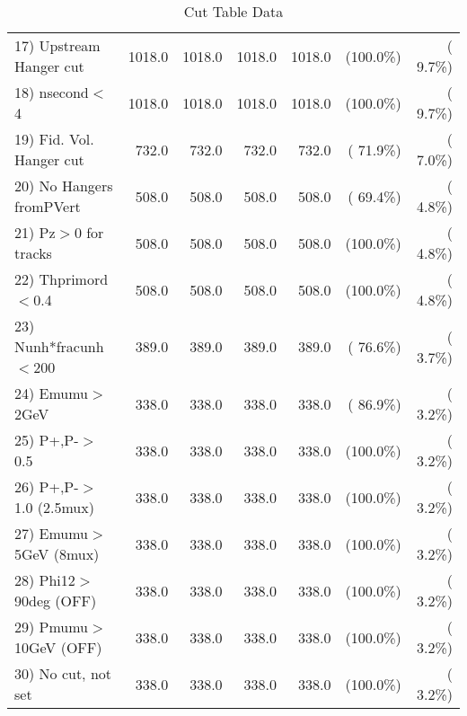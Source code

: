 \begin{table}[h!]
\begin{tabular}{||l||r|r|r|r|r|r||}
 17) Upstream Hanger cut  &       1018.0 &       1018.0 &       1018.0 &       1018.0 & (100.0\%) & (  9.7\%) \\
 18) nsecond$<$4          &       1018.0 &       1018.0 &       1018.0 &       1018.0 & (100.0\%) & (  9.7\%) \\
 19) Fid. Vol. Hanger cut &        732.0 &        732.0 &        732.0 &        732.0 & ( 71.9\%) & (  7.0\%) \\
 20) No Hangers fromPVert &        508.0 &        508.0 &        508.0 &        508.0 & ( 69.4\%) & (  4.8\%) \\
 21) Pz$>$0 for tracks    &        508.0 &        508.0 &        508.0 &        508.0 & (100.0\%) & (  4.8\%) \\
 22) Thprimord$<$0.4      &        508.0 &        508.0 &        508.0 &        508.0 & (100.0\%) & (  4.8\%) \\
 23) Nunh*fracunh$<$200   &        389.0 &        389.0 &        389.0 &        389.0 & ( 76.6\%) & (  3.7\%) \\
 24) Emumu$>$2GeV         &        338.0 &        338.0 &        338.0 &        338.0 & ( 86.9\%) & (  3.2\%) \\
 25) P+,P-$>$0.5          &        338.0 &        338.0 &        338.0 &        338.0 & (100.0\%) & (  3.2\%) \\
 26) P+,P-$>$1.0 (2.5mux) &        338.0 &        338.0 &        338.0 &        338.0 & (100.0\%) & (  3.2\%) \\
 27) Emumu$>$5GeV  (8mux) &        338.0 &        338.0 &        338.0 &        338.0 & (100.0\%) & (  3.2\%) \\
 28) Phi12$>$90deg  (OFF) &        338.0 &        338.0 &        338.0 &        338.0 & (100.0\%) & (  3.2\%) \\
 29) Pmumu$>$10GeV  (OFF) &        338.0 &        338.0 &        338.0 &        338.0 & (100.0\%) & (  3.2\%) \\
 30) No cut, not set      &        338.0 &        338.0 &        338.0 &        338.0 & (100.0\%) & (  3.2\%) \\
 \hline
 \hline
 \end{tabular}
 \caption{Cut Table  Data     }
 \label{tab-cutcohjpsi-mumu_data}
 \end{table}
